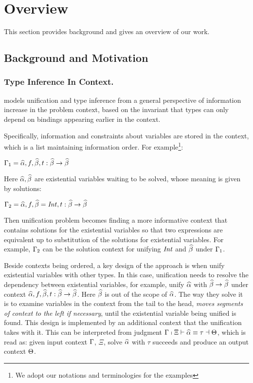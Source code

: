 \section{Overview}

This section provides background and gives an overview of our work.

\subsection{Background and Motivation}

\subsubsection{Type Inference In Context.}

\citet{gundry2010type} models unification and type inference from a general
perspective of information increase in the problem context, based on the
invariant that types can only depend on bindings appearing earlier in the
context.

Specifically, information and constraints about variables are stored in the
context, which is a list maintaining information order. For example\footnote{We
  adopt our notations and terminologies for the examples}:

$\Gamma_1 = \widehat{\alpha}, f, \widehat{\beta}, t :\widehat{\beta} \to \widehat{\beta}$

Here $\widehat{\alpha}, \widehat{\beta}$ are existential variables waiting to be solved, whose
meaning is given by solutions:

$\Gamma_2 = \widehat{\alpha}, f, \widehat{\beta} = \mathit{Int}, t :\widehat{\beta} \to \widehat{\beta}$

Then unification problem becomes finding a more informative context that
contains solutions for the existential variables so that two expressions are
equivalent up to substitution of the solutions for existential variables. For
example, $\Gamma_2$ can be the solution context for unifying
$\mathit{Int}$ and $\widehat{\beta}$ under $\Gamma_1$.

Beside contexts being ordered, a key design of the approach is when unify
existential variables with other types. In this case, unification needs to
resolve the dependency between existential variables, for example, unify $\widehat{\alpha}$
with $\widehat{\beta} \to \widehat{\beta}$ under context $\widehat{\alpha}, f, \widehat{\beta}, t : \widehat{\beta} \to \widehat{\beta}$.
Here $\widehat{\beta}$ is out of the scope of $\widehat{\alpha}$. The way they
solve it is to examine variables in the context from the tail to the head,
\textit{moves segments of context to the left if necessary}, until the
existential variable being unified is found. This design is implemented by an
additional context that the unification takes with it. This can be interpreted
from judgment $\Gamma \shortmid \Xi \vdash \widehat{\alpha} \equiv \tau \dashv \Theta$, which is
read as: given input context $\Gamma$, $\Xi$, solve $\widehat{\alpha}$ with $\tau$ succeeds
and produce an output context $\Theta$.

